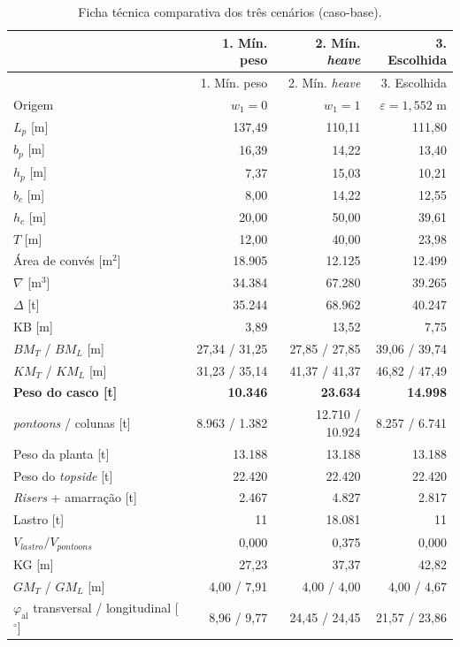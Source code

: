 \documentclass[11pt,a4paper]{article}
\renewcommand{\arraystretch}{1.18}
\newcommand{\phial}{\varphi_{\mathrm{al}}}
\begin{document}
\needspace{0.75\textheight}
{\small\renewcommand{\arraystretch}{1.04}
\begin{longtable}{lrrr}
\caption{Ficha técnica comparativa dos três cenários (caso-base).}\label{tab:ficha}\\
\toprule
 & 1. Mín. peso & 2. Mín. \emph{heave} & 3. Escolhida \\
\midrule
\endfirsthead
\toprule
 & 1. Mín. peso & 2. Mín. \emph{heave} & 3. Escolhida \\
\midrule
\endhead
Origem & $w_1 = 0$ & $w_1 = 1$ & $\varepsilon = 1{,}552$ m \\
$L_p$ [m] & 137,49 & 110,11 & 111,80 \\
$b_p$ [m] & 16,39 & 14,22 & 13,40 \\
$h_p$ [m] & 7,37 & 15,03 & 10,21 \\
$b_c$ [m] & 8,00 & 14,22 & 12,55 \\
$h_c$ [m] & 20,00 & 50,00 & 39,61 \\
$T$ [m] & 12,00 & 40,00 & 23,98 \\
Área de convés [m$^2$] & 18.905 & 12.125 & 12.499 \\
\midrule
$\nabla$ [m$^3$] & 34.384 & 67.280 & 39.265 \\
$\Delta$ [t] & 35.244 & 68.962 & 40.247 \\
KB [m] & 3,89 & 13,52 & 7,75 \\
$BM_T$ / $BM_L$ [m] & 27,34 / 31,25 & 27,85 / 27,85 & 39,06 / 39,74 \\
$KM_T$ / $KM_L$ [m] & 31,23 / 35,14 & 41,37 / 41,37 & 46,82 / 47,49 \\
\midrule
\textbf{Peso do casco [t]} & \textbf{10.346} & \textbf{23.634} & \textbf{14.998} \\
\quad \emph{pontoons} / colunas [t] & 8.963 / 1.382 & 12.710 / 10.924 & 8.257 / 6.741 \\
Peso da planta [t] & 13.188 & 13.188 & 13.188 \\
Peso do \emph{topside} [t] & 22.420 & 22.420 & 22.420 \\
\emph{Risers} + amarração [t] & 2.467 & 4.827 & 2.817 \\
Lastro [t] & 11 & 18.081 & 11 \\
$V_{lastro}/V_{pontoons}$ & 0,000 & 0,375 & 0,000 \\
KG [m] & 27,23 & 37,37 & 42,82 \\
$GM_T$ / $GM_L$ [m] & 4,00 / 7,91 & 4,00 / 4,00 & 4,00 / 4,67 \\
\midrule
$\phial$ transversal / longitudinal [$^\circ$] & 8,96 / 9,77 & 24,45 / 24,45 & 21,57 / 23,86 \\

\end{longtable}}
\end{document}
